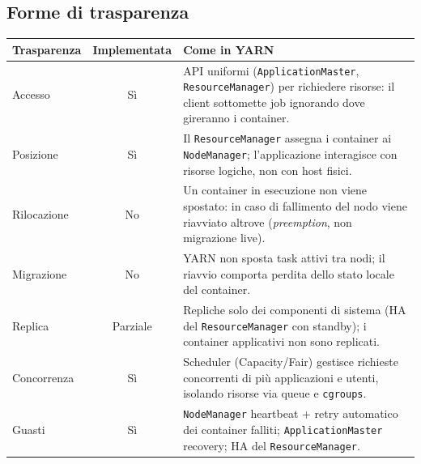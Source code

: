\subsection{Forme di trasparenza}
\begin{table}[htbp]
\centering
\begin{tabularx}{\textwidth}{l c X}
\toprule
\textbf{Trasparenza} & \textbf{Implementata} & \textbf{Come in YARN} \\
\midrule
Accesso & Sì & API uniformi (\texttt{ApplicationMaster}, \texttt{ResourceManager}) per richiedere risorse: il client sottomette job ignorando dove gireranno i container. \\
\addlinespace
Posizione & Sì & Il \texttt{ResourceManager} assegna i container ai \texttt{NodeManager}; l'applicazione interagisce con risorse logiche, non con host fisici. \\
\addlinespace
Rilocazione & No & Un container in esecuzione non viene spostato: in caso di fallimento del nodo viene riavviato altrove (\textit{preemption}, non migrazione live). \\
\addlinespace
Migrazione & No & YARN non sposta task attivi tra nodi; il riavvio comporta perdita dello stato locale del container. \\
\addlinespace
Replica & Parziale & Repliche solo dei componenti di sistema (HA del \texttt{ResourceManager} con standby); i container applicativi non sono replicati. \\
\addlinespace
Concorrenza & Sì & Scheduler (Capacity/Fair) gestisce richieste concorrenti di più applicazioni e utenti, isolando risorse via queue e \texttt{cgroups}. \\
\addlinespace
Guasti & Sì & \texttt{NodeManager} heartbeat + retry automatico dei container falliti; \texttt{ApplicationMaster} recovery; HA del \texttt{ResourceManager}. \\
\bottomrule
\end{tabularx}
\end{table}

